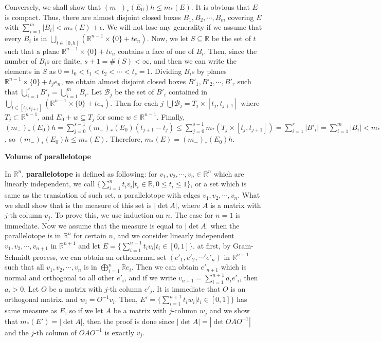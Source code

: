 \documentclass{article}
\newcommand{\ReR}{\mathbb{R}}
\newcommand{\SBar}{|}
\begin{document}
Conversely, we shall show that $(m_-)_*(E_0) h \le m_*(E)$.
It is obvious that $E$ is compact.
Thus, there are almost disjoint closed boxes $B_1, B_2, \cdots, B_m$ covering $E$ with $\sum_{i = 1}^m |B_i| < m_*(E) + \epsilon$.
We will not lose any generality if we assume that every $B_i$ is in $\bigcup_{t \in [0, h]} (\ReR^{n - 1} \times \{0\} + te_n)$.
Now, we let $S \subseteq \ReR$ be the set of $t$ such that a plane $\ReR^{n - 1} \times \{0\} + te_n$ contains a face of one of $B_i$.
Then, since the number of $B_i$s are finite, $s + 1 = \#(S) < \infty$, and then we can write the elements in $S$ as $0 = t_0 < t_1 < t_2 < \cdots < t_s = 1$.
Dividing $B_i$s by planes $\ReR^{n - 1} \times \{0\} + t_j e_n$, we obtain almost disjoint closed boxes $B'_1, B'_2, \cdots, B'_r$ such that $\bigcup_{i = 1}^r B'_i = \bigcup_{i = 1}^m B_i$.
Let $\mathcal{B}_j$ be the set of $B'_i$ contained in $\bigcup_{t \in [t_j, t_{j + 1}]} (\ReR^{n - 1} \times \{0\} + te_n)$.
Then for each $j$ $\bigcup \mathcal{B}_j = T_j \times [t_j, t_{j + 1}]$ where $T_j \subset \ReR^{n - 1}$, and $E_0 + w \subseteq T_j$ for some $w \in \ReR^{n - 1}$.
Finally, $(m_-)_*(E_0) h = \sum_{j = 0}^{s - 1} (m_-)_*(E_0) (t_{j + 1} - t_j) \le \sum_{j = 0}^{s - 1} m_*(T_j \times [t_j, t_{j + 1}]) = \sum_{i = 1}^r |B'_i| = \sum_{i = 1}^m |B_i| < m_*(E) + \epsilon$, so $(m_-)_*(E_0) h \le m_*(E)$.
Therefore, $m_*(E) = (m_-)_*(E_0) h$.

\newpage

\textbf{Volume of parallelotope}

In $\ReR^n$, \textbf{parallelotope} is defined as following: for $v_1, v_2, \cdots, v_n \in \ReR^n$ which are linearly independent, we call $\{ \sum_{i = 1}^n t_i v_i \SBar t_i \in \ReR, 0 \le t_i \le 1 \}$, or a set which is same as the translation of such set, a parallelotope with edges $v_1, v_2, \cdots, v_n$.
What we shall show that is the measure of this set is $|\det{A}|$, where $A$ is a matrix with $j$-th column $v_j$.
To prove this, we use induction on $n$.
The case for $n = 1$ is immediate.
Now we assume that the measure is equal to $|\det{A}|$ when the parallelotope is in $\ReR^n$ for certain $n$, and we consider linearly independent $v_1, v_2, \cdots, v_{n + 1}$ in $\ReR^{n + 1}$ and let $E = \{ \sum_{i = 1}^{n + 1} t_i v_i \SBar t_i \in [0, 1] \}$.
at first, by Gram-Schmidt process, we can obtain an orthonormal set $(e'_1, e'_2, \cdots' e'_n)$ in $\ReR^{n + 1}$ such that all $v_1, v_2, \cdots, v_n$ is in $\bigoplus_{i = 1}^n \ReR e_i$.
Then we can obtain $e'_{n + 1}$ which is normal and orthogonal to all other $e'_i$, and if we write $v_{n + 1} = \sum_{i = 1}^{n + 1} a_i e'_i$, then $a_i > 0$.
Let $O$ be a matrix with $j$-th column $e'_j$.
It is immediate that $O$ is an orthogonal matrix.
and $w_i = O^{-1} v_i$.
Then, $E' = \{ \sum_{i = 1}^{n + 1} t_i w_i \SBar t_i \in [0, 1] \}$ has same measure as $E$, so if we let $A$ be a matrix with $j$-column $w_j$ and we show that $m_*(E') = |\det{A}|$, then the proof is done since $|\det{A}| = |\det{OAO^{-1}}|$ and the $j$-th column of $OAO^{-1}$ is exactly $v_j$.
\end{document}

